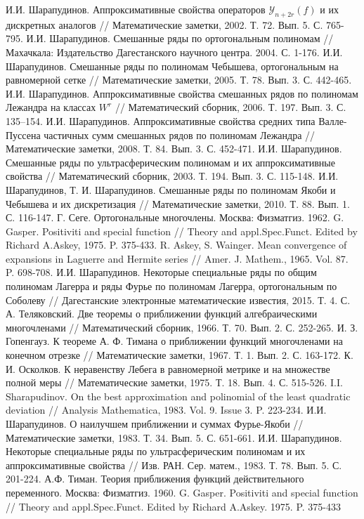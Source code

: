 \begin{thebibliography}{1}
 И.И. Шарапудинов. Аппроксимативные свойства операторов $\mathcal{Y}_{n+2r}(f)$ и их дискретных аналогов // Математические заметки, 2002. Т. 72. Вып. 5. С. 765-795.
 И.И. Шарапудинов. Смешанные ряды по ортогональным полиномам // Махачкала: Издательство Дагестанского научного центра. 2004. С. 1-176.
 И.И. Шарапудинов. Смешанные ряды по полиномам Чебышева, ортогональным на равномерной сетке // Математические заметки, 2005. Т. 78. Вып. 3. С. 442-465.
 И.И. Шарапудинов. Аппроксимативные свойства смешанных рядов по полиномам Лежандра на классах $W^r$ // Математический сборник, 2006. Т. 197. Вып. 3. С. 135–154.
 И.И. Шарапудинов. Аппроксимативные свойства средних типа Валле-Пуссена частичных сумм смешанных рядов по полиномам Лежандра // Математические заметки, 2008. Т. 84. Вып. 3. С. 452-471.
 И.И. Шарапудинов. Смешанные ряды по ультрасферическим полиномам и их аппроксимативные свойства // Математический сборник, 2003. Т. 194. Вып. 3. С. 115-148.
 И.И. Шарапудинов, Т. И. Шарапудинов. Смешанные ряды по полиномам Якоби и Чебышева и их дискретизация // Математические заметки, 2010. Т. 88. Вып. 1. С. 116-147.
 Г. Сеге. Ортогональные многочлены. Москва: Физматгиз. 1962.
 G. Gasper. Positiviti and special function // Theory and appl.Spec.Funct. Edited by Richard A.Askey, 1975. P. 375-433.
 R. Askey, S. Wainger. Mean convergence of expansions in Laguerre and Hermite series // Amer. J. Mathem., 1965. Vol. 87. P. 698-708.
 И.И. Шарапудинов. Некоторые специальные ряды по общим полиномам Лагерра и ряды Фурье по полиномам Лагерра, ортогональным по Соболеву // Дагестанские электронные математические известия, 2015. Т. 4.
 С. А. Теляковский. Две теоремы о приближении функций алгебраическими многочленами // Математический сборник, 1966. Т. 70. Вып. 2. С. 252-265.
 И. З. Гопенгауз. К теореме А. Ф. Тимана о приближении функций многочленами на конечном отрезке // Математические  заметки, 1967. Т. 1. Вып. 2. С. 163-172.
 К. И. Осколков. К неравенству Лебега в равномерной метрике и на множестве полной меры // Математические  заметки, 1975. Т. 18. Вып. 4. С. 515-526.
 I.I. Sharapudinov. On the best approximation and polinomial of the least quadratic deviation // Analysis Mathematica, 1983. Vol. 9. Issue 3. P. 223-234.
 И.И. Шарапудинов. О наилучшем приближении и суммах Фурье-Якоби // Математические заметки, 1983. Т. 34. Вып. 5. С. 651-661.
 И.И. Шарапудинов. Некоторые специальные ряды по ультрасферическим полиномам и их аппроксимативные свойства // Изв. РАН. Сер. матем., 1983. Т. 78. Вып. 5. С. 201-224.
 А.Ф. Тиман. Теория приближения функций действительного переменного. Москва: Физматгиз. 1960.
 G. Gasper. Positiviti and special function //  Theory and appl.Spec.Funct. Edited by Richard A.Askey. 1975. P. 375-433





\end{thebibliography}
